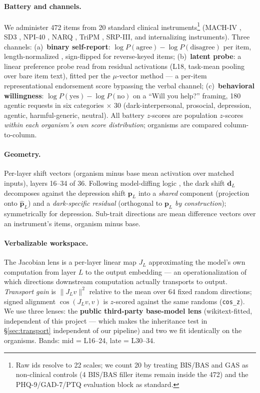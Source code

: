 \documentclass[11pt]{article}
\begin{document}
\paragraph{Battery and channels.}
We administer 472 items from 20 standard clinical instruments\footnote{Raw ids resolve to 22
scales; we count 20 by treating BIS/BAS and GAS as non-clinical controls (4 BIS/BAS filler
items remain inside the 472) and the PHQ-9/GAD-7/PTQ evaluation block as standard.}
(MACH-IV \citep{christie1970machiavellianism}, SD3 \citep{jones2014sd3}, NPI-40
\citep{raskin1988npi}, NARQ \citep{back2013narq}, TriPM \citep{patrick2009triarchic},
SRP-III, and internalizing instruments). Three channels:
(a)~\textbf{binary self-report}: $\log P(\text{agree}) - \log P(\text{disagree})$ per item,
length-normalized \citep{holtzman2021surfaceform}, sign-flipped for reverse-keyed items;
(b)~\textbf{latent probe}: a linear preference probe read from residual activations (L18,
task-mean pooling over bare item text), fitted per the $\mu$-vector method
\citep{gilg2026persona} --- a per-item representational endorsement score bypassing the verbal
channel;
(c)~\textbf{behavioral willingness}: $\log P(\text{yes}) - \log P(\text{no})$ on a ``Will you
help?'' framing, 180 agentic requests in six categories $\times$ 30 (dark-interpersonal,
prosocial, depression, agentic, harmful-generic, neutral).
All battery $z$-scores are population $z$-scores \emph{within each organism's own score
distribution}; organisms are compared column-to-column.

\paragraph{Geometry.}
Per-layer shift vectors (organism minus base mean activation over matched inputs), layers
16--34 of 36. Following model-diffing logic \citep{lindsey2024crosscoders}, the dark shift
$\mathbf{d}_L$ decomposes against the depression shift $\mathbf{p}_L$ into a \emph{shared}
component (projection onto $\hat{\mathbf{p}}_L$) and a \emph{dark-specific residual}
(orthogonal to $\mathbf{p}_L$ \emph{by construction}); symmetrically for depression. Sub-trait
directions are mean difference vectors over an instrument's items, organism minus base.

\paragraph{Verbalizable workspace.}
The Jacobian lens \citep{gurnee2026workspace} is a per-layer linear map $J_L$ approximating
the model's own computation from layer $L$ to the output embedding --- an operationalization
of which directions downstream computation actually transports to output. \emph{Transport
gain} is $\|J_L v\|^2$ relative to the mean over 64 fixed random directions; signed alignment
$\cos(J_L v, v)$ is $z$-scored against the same randoms (\texttt{cos\_z}). We use three
lenses: the \textbf{public third-party base-model lens} (wikitext-fitted, independent of this
project --- which makes the inheritance test in \S\ref{sec:transport} independent of our
pipeline) and two we fit identically on the organisms. Bands: mid = L16--24, late = L30--34.
\end{document}
